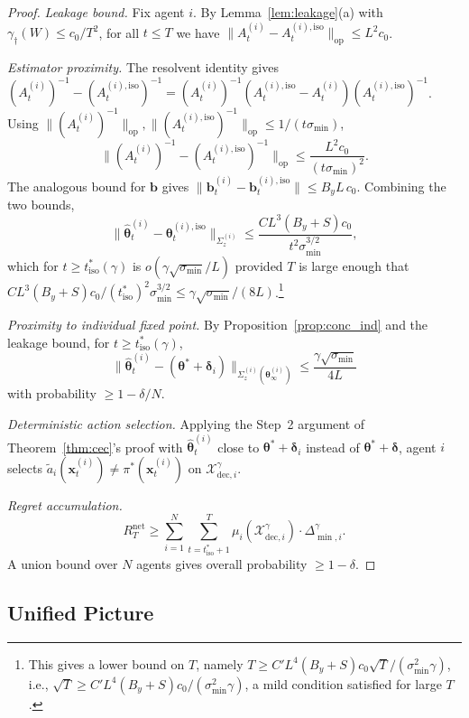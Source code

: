 \documentclass[11pt]{article}
\begin{document}
\begin{proof}
\textit{Leakage bound.}
Fix agent $i$.  By Lemma~\ref{lem:leakage}(a) with
$\gamma_\dagger(W)\leq c_0/T^2$,
for all $t\leq T$ we have
$\|A_t^{(i)}-A_t^{(i),\mathrm{iso}}\|_{\mathrm{op}}\leq L^2 c_0$.

\textit{Estimator proximity.}
The resolvent identity gives
$(A_t^{(i)})^{-1}-(A_t^{(i),\mathrm{iso}})^{-1}
=(A_t^{(i)})^{-1}(A_t^{(i),\mathrm{iso}}-A_t^{(i)})(A_t^{(i),\mathrm{iso}})^{-1}$.
Using $\|(A_t^{(i)})^{-1}\|_{\mathrm{op}},\|(A_t^{(i),\mathrm{iso}})^{-1}\|_{\mathrm{op}}
\leq 1/(t\sigma_{\min})$,
\[
\|(A_t^{(i)})^{-1}-(A_t^{(i),\mathrm{iso}})^{-1}\|_{\mathrm{op}}
\leq\frac{L^2 c_0}{(t\sigma_{\min})^2}.
\]
The analogous bound for $\bm{b}$ gives
$\|\bm{b}_t^{(i)}-\bm{b}_t^{(i),\mathrm{iso}}\|\leq B_y L\,c_0$.
Combining the two bounds,
\[
\|\widehat{\bm{\theta}}_t^{(i)}-\bm{\theta}_t^{(i),\mathrm{iso}}\|_{\Sigma_z^{(i)}}
\leq\frac{CL^3(B_y+S)c_0}{t^2\sigma_{\min}^{3/2}},
\]
which for $t\geq t_{\mathrm{iso}}^*(\gamma)$ is $o(\gamma\sqrt{\sigma_{\min}}/L)$
provided $T$ is large enough that
$CL^3(B_y+S)c_0/(t_{\mathrm{iso}}^*)^2\sigma_{\min}^{3/2}
\leq\gamma\sqrt{\sigma_{\min}}/(8L)$.\footnote{This gives a lower
bound on $T$, namely $T\geq C'L^4(B_y+S)c_0\sqrt{T}/(\sigma_{\min}^2\gamma)$,
i.e., $\sqrt{T}\geq C'L^4(B_y+S)c_0/(\sigma_{\min}^2\gamma)$,
a mild condition satisfied for large $T$.}

\textit{Proximity to individual fixed point.}
By Proposition~\ref{prop:conc_ind} and the leakage bound,
for $t\geq t_{\mathrm{iso}}^*(\gamma)$,
\[
\|\widehat{\bm{\theta}}_t^{(i)}-(\bm{\theta}^{\!*}+\bm{\delta}_i)\|_{\Sigma_z^{(i)}(\bm{\theta}_\infty^{(i)})}
\leq\frac{\gamma\sqrt{\sigma_{\min}}}{4L}
\]
with probability $\geq 1-\delta/N$.

\textit{Deterministic action selection.}
Applying the Step~2 argument of Theorem~\ref{thm:cec}'s proof
with $\widehat{\bm{\theta}}_t^{(i)}$ close to
$\bm{\theta}^{\!*}+\bm{\delta}_i$ instead of $\bm{\theta}^{\!*}+\bm{\delta}$,
agent $i$ selects $\tilde{a}_i(\bm{x}_t^{(i)})\neq\pi^{\!*}(\bm{x}_t^{(i)})$
on $\mathcal{X}_{\mathrm{dec},i}^\gamma$.

\textit{Regret accumulation.}
\[
R_T^{\mathrm{net}}
\geq\sum_{i=1}^N\sum_{t=t_{\mathrm{iso}}^*+1}^T
\mu_i(\mathcal{X}_{\mathrm{dec},i}^\gamma)\cdot\Delta_{\min,i}^\gamma.
\]
A union bound over $N$ agents gives overall probability $\geq 1-\delta$.
\end{proof}

\subsection{Unified Picture}
\end{document}
